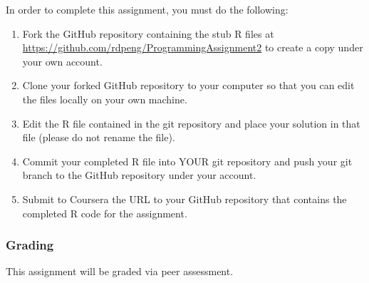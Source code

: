 \documentclass[]{article}
\begin{document}
In order to complete this assignment, you must do the following:

\begin{enumerate}
\def\labelenumi{\arabic{enumi}.}
\itemsep1pt\parskip0pt
\item
  Fork the GitHub repository containing the stub R files at
  \href{https://github.com/rdpeng/ProgrammingAssignment2}{\url{https://github.com/rdpeng/ProgrammingAssignment2}}
  to create a copy under your own account.
\item
  Clone your forked GitHub repository to your computer so that you can
  edit the files locally on your own machine.
\item
  Edit the R file contained in the git repository and place your
  solution in that file (please do not rename the file).
\item
  Commit your completed R file into YOUR git repository and push your
  git branch to the GitHub repository under your account.
\item
  Submit to Coursera the URL to your GitHub repository that contains the
  completed R code for the assignment.
\end{enumerate}

\subsubsection{Grading}\label{grading}

This assignment will be graded via peer assessment.
\end{document}
